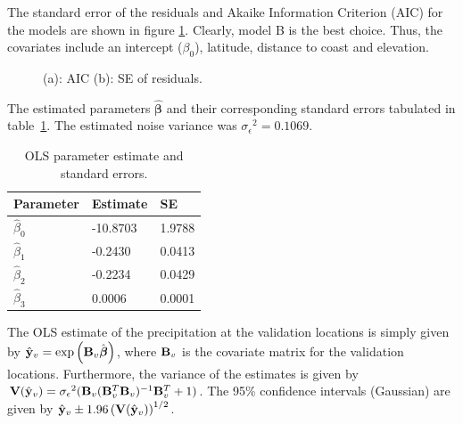 \documentclass[a4paper,10pt]{article}
\def\bB{{\bf B}}
\def\bV{{\bf V}}
\def\by{{\bf y}}
\def\bbeta{{\boldsymbol \beta}}
\def\sigmaeps{{\sigma_{\epsilon}}}
\begin{document}
The standard error of the residuals and Akaike Information Criterion (AIC) for the models are shown in figure \ref{fig:aicse}. Clearly, model B is the best choice. Thus, the covariates include an intercept ($\beta_0$), latitude, distance to coast and elevation.
\begin{figure}[ht]
\centering
  \qquad
  \caption{(a): AIC (b): SE of residuals.}
\label{fig:aicse}
\end{figure}

The estimated parameters $\hat \bbeta$ and their corresponding standard errors tabulated in table~\ref{tab:olsparest}. The estimated noise variance was $\sigmaeps^2 = 0.1069$.
\begin{table}[H]
\centering
\begin{tabular}{lll}
\hline
{\bf Parameter} & {\bf Estimate} & {\bf SE} \\
\hline
$\hat \beta_0$ & -10.8703 & 1.9788 \\
$\hat \beta_1$ & -0.2430 & 0.0413 \\
$\hat \beta_2$ & -0.2234 & 0.0429 \\
$\hat \beta_3$ & 0.0006 & 0.0001 \\
\hline
\end{tabular}
\caption{OLS parameter estimate and standard errors.}
\label{tab:olsparest}
\end{table}

The OLS estimate of the precipitation at the validation locations is simply given by $\hat \by_v = \exp \left( \bB_v \hat \bbeta \right)$, where $\bB_v$ is the covariate matrix for the validation locations. Furthermore, the variance of the estimates is given by $\bV(\hat \by_v) = \sigmaeps^2 (\bB_v (\bB_v^T\bB_v)^{-1} \bB_v^T + 1)$. The 95\% confidence intervals (Gaussian) are given by $\hat \by_v \pm 1.96 \left( \bV(\hat \by_v) \right)^{1/2}$.
\end{document}
